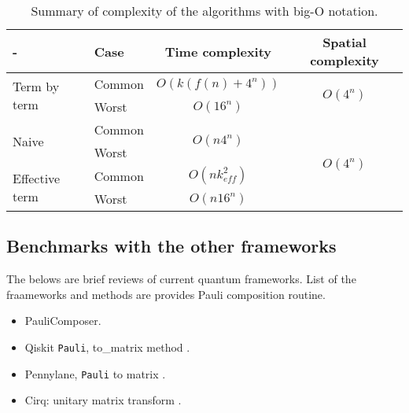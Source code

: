 \documentclass[twocolumn]{article}
\begin{document}
\begin{table*}
    \centering
    \caption{Summary of complexity of the algorithms with big-O notation.}
    \label{table:complexity}
    \begin{tabular}{l|l|cc}
        -                                & Case      & Time complexity                   & Spatial complexity\\
        \hline
        \multirow{2}{8em}{Term by term}  & Common    & $O(k(f(n) +4^n))$                 & \multirow{2}{2em}{$O(4^n)$}\\
                                         & Worst     & $O(16^n)$                         &\\
                                         \hline                                 
        \multirow{2}{8em}{Naive}         & Common    &\multirow{2}{1em}{$O(n4^n)$}        & \multirow{4}{2em}{$O(4^n)$}\\
                                         & Worst     &                                   &\\
        \multirow{2}{8em}{Effective term}& Common    &$O(n  k_{eff}^2)$                 & \\
                                         & Worst     &$O(n16^n)$                         & \\
        \hline                                      
    \end{tabular}
\end{table*}


\subsection{Benchmarks with the other frameworks}

The belows are brief reviews of current quantum frameworks.
List of the fraameworks and methods are provides Pauli composition routine.

\begin{itemize}
    \item PauliComposer\cite{vidal_romero_Paulicomposer_2023}.
    \item Qiskit \texttt{Pauli}, to\_matrix method \cite{Qiskit}.
    \item Pennylane, \texttt{Pauli} to matrix \cite{bergholm2018pennylane}. %
    \item Cirq: unitary matrix transform \cite{cirq_developers_2023_10247207}. %
\end{itemize}
\end{document}
